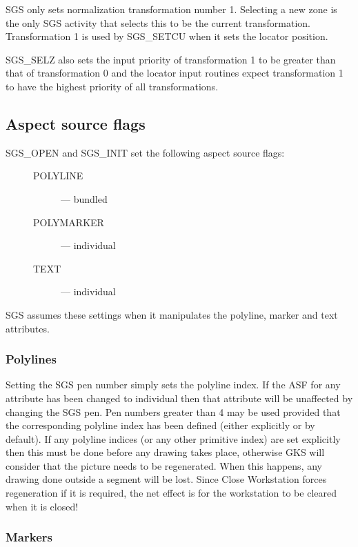\documentclass[11pt]{article}
\newcommand{\htmlref}[2]{#1}
\begin{document}
SGS only sets normalization transformation number 1.
Selecting a new zone is the only SGS activity that selects this to be the
current transformation.
Transformation 1 is used by 
\htmlref{SGS\_SETCU}{SGS_SETCU} when it sets the locator position.

\htmlref{SGS\_SELZ}{SGS_SELZ}
 also sets the input priority of transformation 1 to be greater than
that of transformation 0 and the locator input routines expect transformation
1 to have the highest priority of all transformations.

\subsection* {Aspect source flags}

\htmlref{SGS\_OPEN}{SGS_OPEN} and \htmlref{SGS\_INIT}{SGS_INIT}
set the following aspect source flags:
\begin{description}
\item[\mbox{}]\mbox{}
\begin{description}
\item [POLYLINE] --- bundled
\item [POLYMARKER] --- individual
\item [TEXT] --- individual
\end{description}
\end{description}
SGS assumes these settings when it manipulates the polyline, marker and text
attributes.

\subsubsection* {Polylines}

Setting the SGS pen number simply sets the polyline index.
If the ASF for any attribute has been changed to individual then that attribute
will be unaffected by changing the SGS pen.
Pen numbers greater than 4 may be used provided that the corresponding polyline
index has been defined (either explicitly or by default).
If any polyline indices (or any other primitive index) are set explicitly then
this must be done before any drawing takes place, otherwise GKS will consider
that the picture needs to be regenerated.
When this happens, any drawing done outside a segment will be lost.
Since Close Workstation forces regeneration if it is required, the net effect is
for the workstation to be cleared when it is closed!

\subsubsection* {Markers}
\end{document}
